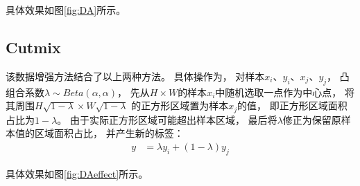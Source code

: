 \documentclass{article}
\begin{document}
具体效果如图\ref{fig:DA}所示。

\subsection{Cutmix}

该数据增强方法结合了以上两种方法。
具体操作为，
对样本$x_i$、$y_i$、$x_j$、$y_j$，
凸组合系数$\lambda \sim Beta(\alpha, \alpha)$，
先从$ H \times W$的样本$x_i$中随机选取一点作为中心点，
将其周围$ H \sqrt{1 - \lambda} \times W \sqrt{1 - \lambda}$
的正方形区域置为样本$x_j$的值，
即正方形区域面积占比为$ 1 - \lambda $。
由于实际正方形区域可能超出样本区域，
最后将$ \lambda $修正为保留原样本值的区域面积占比，
并产生新的标签：
\begin{align*}
y &= \lambda y_i + (1 - \lambda) y_j
\end{align*}

具体效果如图\ref{fig:DAeffect}所示。
\end{document}
